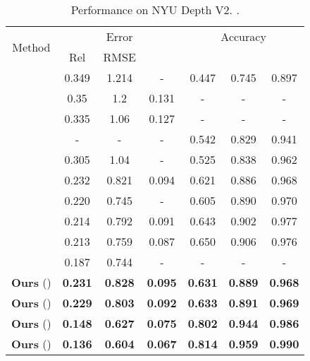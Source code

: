 \documentclass[letterpaper]{article} \usepackage{aaai20}  \usepackage{times}  \usepackage{helvet} \usepackage{courier}  \usepackage{graphicx} \frenchspacing  \setlength{\pdfpagewidth}{8.5in}  \setlength{\pdfpageheight}{11in}  \usepackage{epsfig}
\begin{document}
    \begin{table}[t]
    	\vspace{-8pt}
    	\caption{Performance on NYU Depth V2. .}
    	\label{tab:nyu}
    	\centering
    	\resizebox{0.49\textwidth}{!}
    	{
    		\begin{tabular}{|c|c|c|c|c|c|c|}
    			\hline
    			\multirow{2}{*}{Method}                         & \multicolumn{3}{c|}{Error} & \multicolumn{3}{c|}{Accuracy}        \\ \cline{2-7} 
    			& Rel        & RMSE         &        &  &  &  \\ \hline
    			\cite{Saxena2009Make3D} & 0.349   & 1.214        & -     & 0.447     & 0.745     & 0.897   \\ \hline
    			\cite{Kevin2012Depth}  & 0.35           & 1.2     & 0.131 & - & -      & -   \\ \hline
    			\cite{Liu2014Discrete}  & 0.335  & 1.06 & 0.127 & - & - & - \\ \hline
    			\cite{Shi2014Pulling}   & -  & -  & -  & 0.542  & 0.829  & 0.941             \\ \hline
    			\cite{Zhuo2015Indoor}  & 0.305  & 1.04  & -  & 0.525  & 0.838  & 0.962             \\ \hline
    			\cite{Li2015Depth} & 0.232  & 0.821  & 0.094  & 0.621  & 0.886  & 0.968   \\ \hline
    			\cite{Wang2015Towards}  & 0.220  & 0.745  & -  & 0.605  & 0.890  & 0.970  \\ \hline
    			\cite{Xu2018PAD} & 0.214 &0.792& 0.091& 0.643& 0.902 &0.977 \\ \hline
    			\cite{Liu2016Learning}  & 0.213  & 0.759  & 0.087 & 0.650 & 0.906 & 0.976 \\ \hline
    			\cite{Roy2016Monocular}  & 0.187  & 0.744  & - & - & - & - \\ \hline
    			\textbf{Ours} () & \textbf{0.231}  & \textbf{0.828} & \textbf{0.095} & \textbf{0.631} & \textbf{0.889} & \textbf{0.968} \\ \hline
    			\textbf{Ours} () & \textbf{0.229}  & \textbf{0.803} & \textbf{0.092} & \textbf{0.633} & \textbf{0.891} & \textbf{0.969} \\ \hline
    			\textbf{Ours} () & \textbf{0.148}  & \textbf{0.627} & \textbf{0.075} & \textbf{0.802} & \textbf{0.944} & \textbf{0.986} \\ \hline
    			\textbf{Ours} () & \textbf{0.136}  & \textbf{0.604} & \textbf{0.067} & \textbf{0.814} & \textbf{0.959} & \textbf{0.990} \\ \hline
    	\end{tabular}}
    	\vspace{-12pt}
    \end{table}
\end{document}
